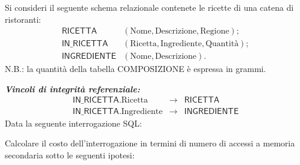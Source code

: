 \documentclass[a4paper]{article}
\begin{document}
	Si consideri il seguente schema relazionale contenete le ricette di una catena di ristoranti:
	\begin{equation*}
		\begin{array}{rl}
			\textsf{RICETTA} & \left(\text{Nome}, \text{Descrizione}, \text{Regione}\right); \\[0.3em]
			\textsf{IN\_RICETTA} & \left(\text{Ricetta}, \text{Ingrediente}, \text{Quantità}\right); \\[0.3em]
			\textsf{INGREDIENTE} & \left(\text{Nome}, \text{Descrizione}\right).
		\end{array}
	\end{equation*}
	N.B.: la quantità della tabella \textsf{COMPOSIZIONE} è espressa in grammi.\newline
	
	\noindent
	\emph{\textbf{Vincoli di integrità referenziale:}}
	\begin{equation*}
		\begin{array}{lll}
			\textsf{IN\_RICETTA}.\text{Ricetta} 		&\rightarrow& \textsf{RICETTA} \\ [0.3em]
			\textsf{IN\_RICETTA}.\text{Ingrediente} 	&\rightarrow& \textsf{INGREDIENTE}
		\end{array}
	\end{equation*}
	Data la seguente interrogazione SQL:
	
	Calcolare il costo dell'interrogazione in termini di numero di accessi a memoria secondaria sotto le seguenti ipotesi:
\end{document}
